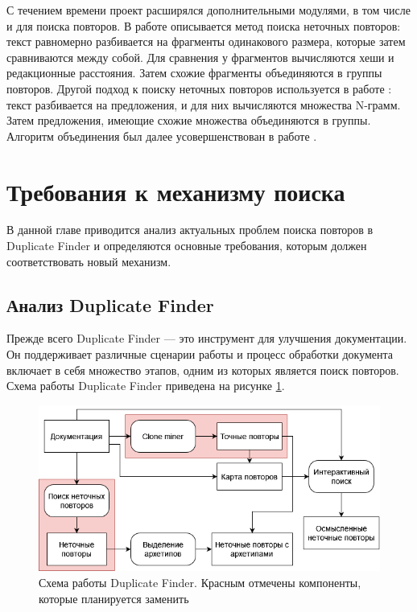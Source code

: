 \documentclass[14pt]{matmex-diploma-custom}
\begin{document}
С течением времени проект расширялся дополнительными модулями, в том числе и для поиска повторов. В работе \cite{bib:tool:FuzzySearch} описывается метод поиска неточных повторов: текст равномерно разбивается на фрагменты одинакового размера, которые затем сравниваются между собой. Для сравнения у фрагментов вычисляются хеши и редакционные расстояния. Затем схожие фрагменты объединяются в группы повторов. Другой подход к поиску неточных повторов используется в работе \cite{bib:tool:NgramSearch}: текст разбивается на предложения, и для них вычисляются множества N-грамм. Затем предложения, имеющие схожие множества объединяются в группы. Алгоритм объединения был далее усовершенствован в работе \cite{bib:tool:ImprovedNgramSearch}.

\section{Требования к механизму поиска}

В данной главе приводится анализ актуальных проблем поиска повторов в Duplicate Finder и определяются основные требования, которым должен соответствовать новый механизм.

\subsection{Анализ Duplicate Finder}

Прежде всего Duplicate Finder --- это инструмент для улучшения документации. Он поддерживает различные сценарии работы и процесс обработки документа включает в себя множество этапов, одним из которых является поиск повторов. Схема работы Duplicate Finder приведена на рисунке \ref{fig:DuplicateFinder}.

\begin{figure}[h]
	\includegraphics[scale=0.65]{pictures/DuplicateFinder.png}
	\centering
	\caption{Схема работы Duplicate Finder. Красным отмечены компоненты, которые планируется заменить}
	\label{fig:DuplicateFinder}
\end{figure}
\end{document}
